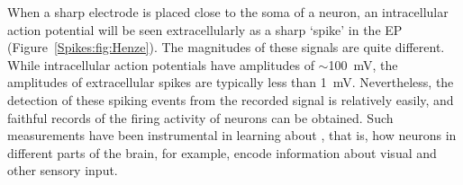 When a sharp electrode is placed close to the soma of a neuron, an intracellular action potential will be seen
extracellularly as a sharp `spike' in the EP (Figure~\ref{Spikes:fig:Henze}). The magnitudes of these signals are quite different. While intracellular action potentials have amplitudes of $\sim$100~mV, the amplitudes of extracellular
spikes are typically less than 1~mV. Nevertheless, the detection of these spiking events from the recorded signal is relatively easily, and faithful records of the firing activity of neurons can be obtained. Such measurements have been instrumental in learning about , that is, how neurons in different parts of the brain, for example, encode information about visual and other sensory input. 

